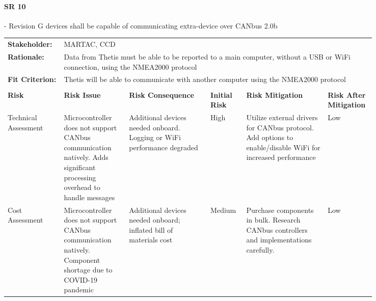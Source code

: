 \begin{landscape}


\paragraph*{SR 10} - Revision G devices shall be capable of communicating extra-device over CANbus 2.0b

{\fontsize{8pt}{8pt}\selectfont
\begin{longtable}{| p{0.12\linewidth} | p{0.16\linewidth} |  p{0.20\linewidth} | p{0.08\linewidth} | p{0.20\linewidth} | p{0.08\linewidth} |}
	\hline \endlastfoot
	
	\hline
	\rowcolor[gray]{0.8}
	\multicolumn{6}{|c|}{ } \\
	\hline
	\textbf{Stakeholder:} & \multicolumn{5}{|l|}{MARTAC, CCD} \\
	\hline
	\textbf{Rationale:} & \multicolumn{5}{|p{0.8\linewidth}|}{Data from Thetis must be able to be reported to a main computer, without a USB or WiFi connection, using the NMEA2000 protocol} \\
	\hline
	\textbf{Fit Criterion:} & \multicolumn{5}{|p{0.8\linewidth}|}{Thetis will be able to communicate with another computer using the NMEA2000 protocol} \\
	\hline
	\rowcolor[gray]{0.8}
	\multicolumn{6}{|c|}{ } \\
	\hline
	\textbf{Risk} & \textbf{Risk Issue} & \textbf{Risk Consequence} & \textbf{Initial Risk} & \textbf{Risk Mitigation} & \textbf{Risk \newline After \newline Mitigation} \\
	\hline
	Technical \newline Assessment & Microcontroller does not support CANbus communication natively. \newline Adds significant processing overhead to handle messages & Additional devices needed onboard. \newline Logging or WiFi performance degraded & \cellcolor{red} High & Utilize external drivers for CANbus protocol. \newline Add options to enable/disable WiFi for increased performance & \cellcolor{green} Low \\
	\hline
	Cost \newline Assessment & Microcontroller does not support CANbus communication natively. \newline Component shortage due to COVID-19 pandemic & Additional devices needed onboard; inflated bill of materials cost & \cellcolor{yellow} Medium & Purchase components in bulk. \newline Research CANbus controllers and implementations carefully. & \cellcolor{green} Low \\

\end{longtable}}
\end{landscape}
